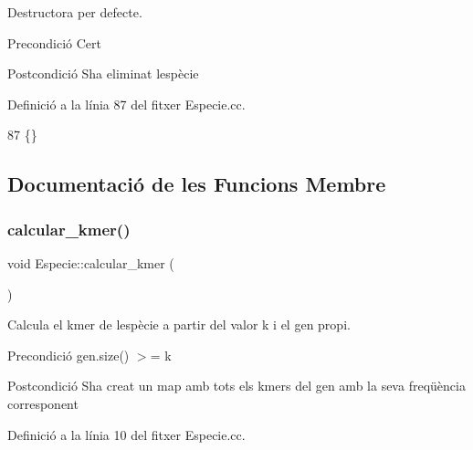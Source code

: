 Destructora per defecte. 

\begin{DoxyPrecond}{Precondició}
Cert 
\end{DoxyPrecond}
\begin{DoxyPostcond}{Postcondició}
S\textquotesingle{}ha eliminat l\textquotesingle{}espècie 
\end{DoxyPostcond}


Definició a la línia 87 del fitxer Especie.\+cc.


\begin{DoxyCode}
87 \{\}
\end{DoxyCode}


\subsection{Documentació de les Funcions Membre}
\mbox{\label{class_especie_ae0e15597807d18f35773c9071c2913c8}} 
\subsubsection{\texorpdfstring{calcular\+\_\+kmer()}{calcular\_kmer()}}
{\footnotesize\ttfamily void Especie\+::calcular\+\_\+kmer (\begin{DoxyParamCaption}{ }\end{DoxyParamCaption})\hspace{0.3cm}{\ttfamily [private]}}



Calcula el kmer de l\textquotesingle{}espècie a partir del valor k i el gen propi. 

\begin{DoxyPrecond}{Precondició}
gen.\+size() $>$= k 
\end{DoxyPrecond}
\begin{DoxyPostcond}{Postcondició}
S\textquotesingle{}ha creat un map amb tots els kmers del gen amb la seva freqüència corresponent 
\end{DoxyPostcond}


Definició a la línia 10 del fitxer Especie.\+cc.



